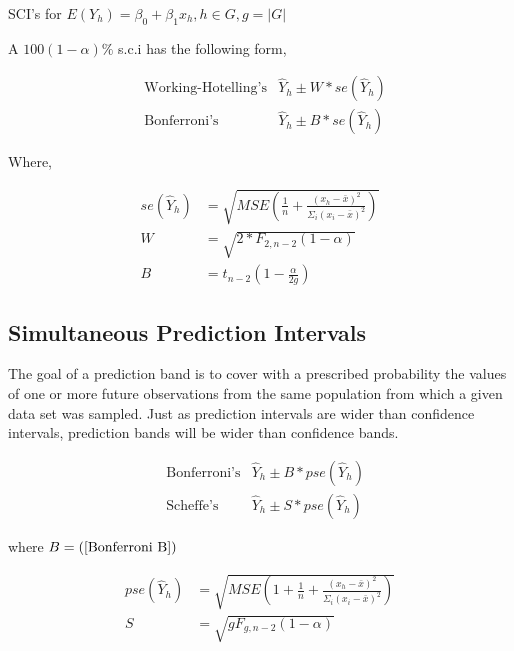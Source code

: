 \documentclass[10pt]{article}
\begin{document}
\begin{multicols}{3}
    SCI's for $E(Y_h) = \beta_0 + \beta_1 x_h, h \in G, g = |G|$

    A $100(1 - \alpha)\%$ s.c.i has the following form,

    \begin{align}
         & \text{Working-Hotelling's} & \hat Y_h \pm W * se(\hat Y_h) \\
         & \text{Bonferroni's}        & \hat Y_h \pm B * se(\hat Y_h)
    \end{align}

    Where,

    \begin{align}\label{SCI SE}
        se(\hat Y_h) & = \sqrt{MSE \left(\frac{1}{n} + \frac{ (x_h - \bar x)^2 }{ \Sigma_i (x_i - \bar x)^2 } \right)} \\
        \label{Working W}
        W            & = \sqrt{2 * F_{2, n - 2} (1 - \alpha)}                                                          \\
        \label{Bonferroni B}
        B            & = t_{n - 2} \left( 1 - \frac{\alpha}{2g} \right)
    \end{align}

    \subsection{Simultaneous Prediction Intervals}

    The goal of a prediction band is to cover with a prescribed probability the values of one or more future observations from the same population from which a given data set was sampled. Just as prediction intervals are wider than confidence intervals, prediction bands will be wider than confidence bands.

    \begin{align}
         & \text{Bonferroni's} & \hat Y_h \pm B * pse(\hat Y_h) \\
         & \text{Scheffe's}    & \hat Y_h \pm S * pse(\hat Y_h)
    \end{align}

    where $B = (\ref{Bonferroni B})$

    \begin{align}
        pse(\hat Y_h) & = \sqrt{MSE \left(1 + \frac{1}{n} + \frac{ (x_h - \bar x)^2 }{ \Sigma_i (x_i - \bar x)^2 } \right)} \\
        S             & = \sqrt{g F_{g, n -2} (1 - \alpha) }                                                                \\
    \end{align}


\end{multicols}
\end{document}
